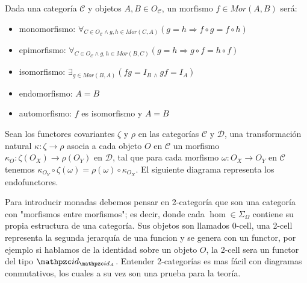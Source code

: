 \begin{defn}
Dada una categoría $\mathcal{C}$ y objetos $ A,B \in O_{\mathcal{C}}$, un morfismo $f \in Mor(A,B)$ será:
\end{defn}
\begin{itemize}
\item monomorfismo: $\forall_{ C \in O_{\mathcal{C}} \wedge g,h \in Mor(C,A)}(g=h \Rightarrow f \circ g=f\circ h)$
\item epimorfismo: $\forall_{ C \in O_{\mathcal{C}} \wedge g,h \in Mor(B,C)}(g=h \Rightarrow g \circ f=h\circ f)$
\item isomorfismo: $\exists_{g \in Mor(B,A)} ( fg = I_{B} \ _{\wedge} \ gf = I_{A})$
\item endomorfismo: $A=B$
\item automorfismo: $f$ es isomorfismo y $A=B$
\end{itemize}

\begin{defn}\end{defn}
Sean los functores covariantes $\zeta$ y $\rho$ en las categorías $\mathcal{C}$ y $\mathcal{D}$, una transformación natural $\kappa : \zeta \rightarrow \rho$ asocia a cada objeto $O$ en $\mathcal{C}$ un morfismo 
$\kappa_{O} : \zeta(O_X) \rightarrow \rho(O_Y)$ en $\mathcal{D}$, tal que para cada morfismo $\omega : O_X \rightarrow O_Y$ en $\mathcal{C}$ tenemos $\kappa_{O_Y} \circ \zeta(\omega) = \rho(\omega) \circ \kappa_{O_X}$. El siguiente diagrama representa los endofunctores.

\begin{figure}[h!]
\centerline{
}
\end{figure}

\begin{note}
Para introducir monadas debemos pensar en 2-categoría que son una categoría con "morfismos entre morfismos"; es decir, donde cada $\hom \in \Sigma_{\Omega}$ contiene su propia estructura de una categoría. Sus objetos son llamados 0-cell, una 2-cell representa la segunda jerarquía de una funcion y se genera con un functor, por ejemplo si hablamos de la identidad sobre un objeto $O$, la 2-cell sera un functor del tipo $\id_{\id_{A}}$. Entender 2-categorías es mas fácil con diagramas conmutativos, los cuales a su vez son una prueba para la teoría.
\end{note}

